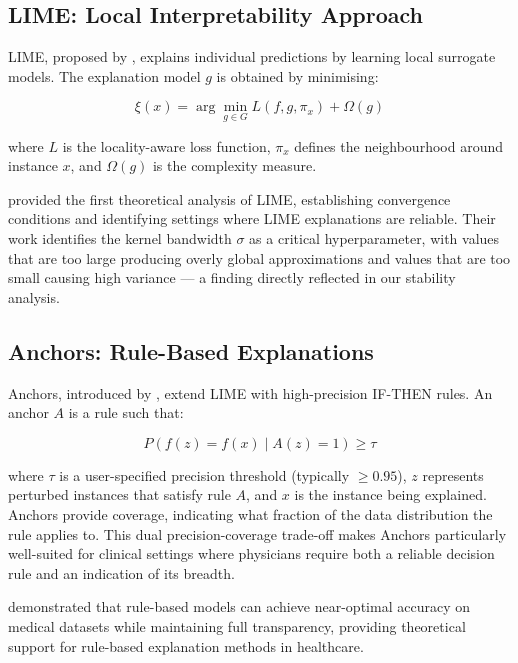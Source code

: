 \documentclass[journal]{IEEEtran}
\newcommand{\citet}[1]{\cite{#1}}
\begin{document}
\subsection{LIME: Local Interpretability Approach}

LIME, proposed by \citet{ribeiro2016should}, explains individual predictions by learning local surrogate models. The explanation model $g$ is obtained by minimising:

\begin{equation}
\xi(x) = \arg\min_{g \in G} L(f, g, \pi_x) + \Omega(g)
\end{equation}

where $L$ is the locality-aware loss function, $\pi_x$ defines the neighbourhood around instance $x$, and $\Omega(g)$ is the complexity measure.

\citet{garreau2020explaining} provided the first theoretical analysis of LIME, establishing convergence conditions and identifying settings where LIME explanations are reliable. Their work identifies the kernel bandwidth $\sigma$ as a critical hyperparameter, with values that are too large producing overly global approximations and values that are too small causing high variance — a finding directly reflected in our stability analysis.

\subsection{Anchors: Rule-Based Explanations}

Anchors, introduced by \citet{ribeiro2018anchors}, extend LIME with high-precision IF-THEN rules. An anchor $A$ is a rule such that:

\begin{equation}
P(f(z) = f(x) \mid A(z) = 1) \geq \tau
\end{equation}

where $\tau$ is a user-specified precision threshold (typically $\geq 0.95$), $z$ represents perturbed instances that satisfy rule $A$, and $x$ is the instance being explained. Anchors provide coverage, indicating what fraction of the data distribution the rule applies to. This dual precision-coverage trade-off makes Anchors particularly well-suited for clinical settings where physicians require both a reliable decision rule and an indication of its breadth.

\citet{angelino2017learning} demonstrated that rule-based models can achieve near-optimal accuracy on medical datasets while maintaining full transparency, providing theoretical support for rule-based explanation methods in healthcare.
\end{document}
